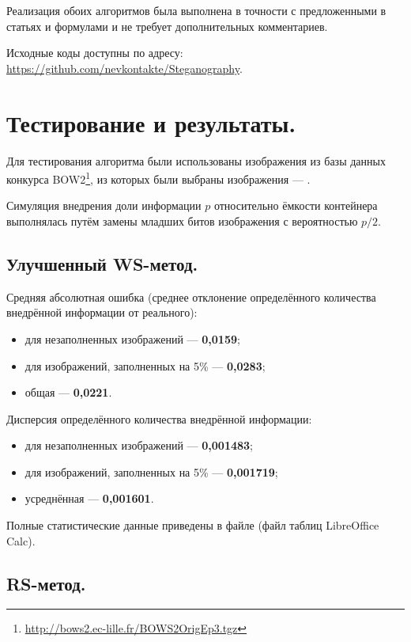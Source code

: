 \documentclass[12pt,a4paper,russian,numbers=endperiod]{scrartcl}
\begin{document}
Реализация обоих алгоритмов была выполнена в точности с предложенными в статьях \cite{ker} и \cite{fridrich} формулами и не требует дополнительных комментариев.

Исходные коды доступны по адресу: \url{https://github.com/nevkontakte/Steganography}.

\section{Тестирование и результаты.}

Для тестирования алгоритма были использованы изображения из базы данных конкурса BOW2\footnote{\url{http://bows2.ec-lille.fr/BOWS2OrigEp3.tgz}}, из которых были выбраны изображения  --- .

Симуляция внедрения доли информации $p$ относительно ёмкости контейнера выполнялась путём замены младших битов изображения с вероятностью $p/2$.

\subsection{Улучшенный WS-метод.}

Средняя абсолютная ошибка (среднее отклонение определённого количества внедрённой информации от реального):
\begin{itemize}
	\item для незаполненных изображений --- \textbf{0,0159};
	\item для изображений, заполненных на 5\% --- \textbf{0,0283};
	\item общая --- \textbf{0,0221}.
\end{itemize}

Дисперсия определённого количества внедрённой информации:

\begin{itemize}
	\item для незаполненных изображений --- \textbf{0,001483};
	\item для изображений, заполненных на 5\% --- \textbf{0,001719};
	\item усреднённая --- \textbf{0,001601}.
\end{itemize}

Полные статистические данные приведены в файле  (файл таблиц LibreOffice Calc).

\subsection{RS-метод.}
\end{document}
